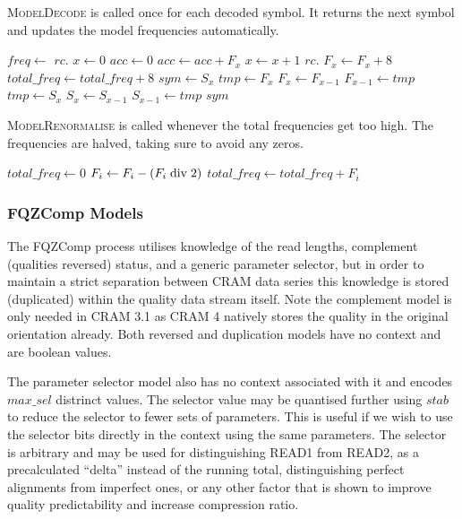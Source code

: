 \documentclass[a4paper]{article}
\begin{document}
\textsc{ModelDecode} is called once for each decoded symbol.
It returns the next symbol and updates the model frequencies automatically.

\begin{algorithmic}[1]
  \State $freq \gets$ $rc.$
  \State $x \gets 0$
  \State $acc \gets 0$
    \State $acc \gets acc + F_x$
    \State $x \gets x+1$
  \EndWhile
  \State $rc.$
  \State $F_x \gets F_x + 8$ 
  \State $total\_freq \gets total\_freq + 8$
    \State {}
  \EndIf
  \State $sym \gets S_x$
    \State $tmp \gets F_x$ 
    \State $F_x \gets F_{x-1}$
    \State $F_{x-1} \gets tmp$
    \State $tmp \gets S_x$ 
    \State $S_x \gets S_{x-1}$
    \State $S_{x-1} \gets tmp$
  \EndIf
  \State \Return $sym$
\EndFunction
\end{algorithmic}

\textsc{ModelRenormalise} is called whenever the total frequencies get too high.
The frequencies are halved, taking sure to avoid any zeros.

\begin{algorithmic}[1]
  \State $total\_freq \gets 0$
    \State $F_i \gets F_i - (F_i \bdiv 2)$
    \State $total\_freq \gets total\_freq + F_i$
  \EndFor
\EndProcedure
\end{algorithmic}

\subsubsection*{FQZComp Models}

The FQZComp process utilises knowledge of the read lengths, complement
(qualities reversed) status, and a generic parameter selector, but in
order to maintain a strict separation between CRAM data series this
knowledge is stored (duplicated) within the quality data stream
itself.  Note the complement model is only needed in CRAM 3.1 as CRAM
4 natively stores the quality in the original orientation already.
Both reversed and duplication models have no context and are boolean
values.

The parameter selector model also has no context associated with it
and encodes $max\_sel$ distrinct values.  The selector value may be
quantised further using $stab$ to reduce the selector to fewer
sets of parameters.  This is useful if we wish to use the selector
bits directly in the context using the same parameters.  The selector
is arbitrary and may be used for distinguishing READ1 from READ2, as
a precalculated ``delta'' instead of the running total, distinguishing
perfect alignments from imperfect ones, or any other factor that is
shown to improve quality predictability and increase compression
ratio.
\end{document}
